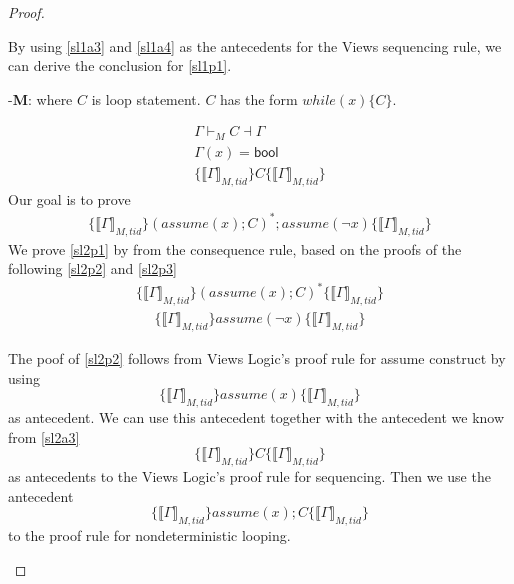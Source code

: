 \begin{proof}
\begin{case}
  By using \ref{sl1a3} and \ref{sl1a4} as the antecedents for the Views sequencing rule, we can derive the conclusion for \ref{sl1p1}.
  \end{case}
  
  \begin{case}-\textbf{M}: where $C$ is loop statement. $C$ has the form $while\left(x\right)\{C\}$.

     \begin{gather}\label{sl2a1}
       \Gamma \vdash_{M} C \dashv \Gamma \\
       \label{sl2a2}
       \Gamma(x) = \textsf{bool} \\ 
       \label{sl2a3}
       \{\llbracket \Gamma \rrbracket_{M,tid} \}  C  \{\llbracket \Gamma \rrbracket_{M,tid}\} 
     \end{gather}
    Our goal is to prove
    \begin{gather}\label{sl2p1}
      \{\llbracket \Gamma \rrbracket_{M,tid} \} \left(assume\left(x\right);C\right)^{*};assume(\lnot x) \{\llbracket \Gamma \rrbracket_{M,tid} \}
    \end{gather}
 We prove \ref{sl2p1} by from the consequence rule, based on the proofs of the following \ref{sl2p2} and \ref{sl2p3}
    \begin{gather}\label{sl2p2}
      \{ \llbracket \Gamma \rrbracket_{M,tid} \}\left(assume\left(x\right);C\right)^{*} \{ \llbracket \Gamma \rrbracket_{M,tid} \}
    \end{gather}
    \begin{gather}\label{sl2p3}
      \{ \llbracket \Gamma \rrbracket_{M,tid} \}assume\left(\lnot x\right)\{ \llbracket \Gamma \rrbracket_{M,tid} \}
    \end{gather}
    
   The poof of \ref{sl2p2} follows from Views Logic's proof rule for assume construct by using
      \[\{\llbracket\Gamma \rrbracket_{M,tid}\} assume\left(x\right) \{\llbracket \Gamma \rrbracket_{M,tid} \}\]
      as antecedent. We can use this antecedent together with the antecedent we know from \ref{sl2a3}
      \[\{\llbracket \Gamma \rrbracket_{M,tid} \}C\{\llbracket \Gamma \rrbracket_{M,tid}\}\]
      as antecedents to the Views Logic's proof rule for sequencing. Then we use the antecedent
      \[ \{\llbracket \Gamma \rrbracket_{M,tid} \}assume\left(x\right);C\{\llbracket \Gamma \rrbracket_{M,tid} \}\] to the proof rule for nondeterministic looping.
  

\end{case}
\end{proof}
